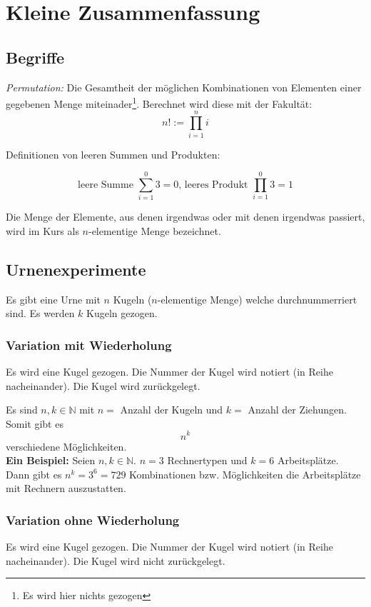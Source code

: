 \documentclass[12pt, twoside]{article}
\newcommand{\N}{\mathbb{N}}
\begin{document}
\section{Kleine Zusammenfassung}
\subsection{Begriffe}
\textit{Permutation:} Die Gesamtheit der möglichen Kombinationen von Elementen einer gegebenen
Menge miteinader\footnote{Es wird hier nichts gezogen}. Berechnet wird diese mit der Fakultät:
$$n!:= \prod_{i=1}^{n}i$$



Definitionen von leeren Summen und Produkten:

$$
\text{leere Summe } \sum_{i=1}^{0}3=0 \text{, leeres Produkt } \prod_{i=1}^{0}3=1
$$

Die Menge der Elemente, aus denen irgendwas oder mit denen irgendwas passiert,
wird im Kurs als $n$-elementige Menge bezeichnet. 

\subsection{Urnenexperimente}
Es gibt eine Urne mit $n$ Kugeln ($n$-elementige Menge) welche durchnummerriert sind. Es werden $k$ Kugeln gezogen.
\subsubsection{Variation mit Wiederholung}

Es wird eine Kugel gezogen. Die Nummer der Kugel wird notiert (in Reihe nacheinander). Die Kugel
wird zurückgelegt. 

Es sind $n, k \in \N$ mit $n=$ Anzahl der Kugeln und $k=$ Anzahl der Ziehungen. Somit gibt es
$$
n^k
$$
verschiedene Möglichkeiten. \\

\textbf{Ein Beispiel:} Seien $n, k \in \N$. $n=3$ Rechnertypen und $k=6$ Arbeitsplätze. Dann gibt es $n^k=3^6=729$ Kombinationen bzw. Möglichkeiten
die Arbeitsplätze mit Rechnern auszustatten. \\

\subsubsection{Variation ohne Wiederholung}

Es wird eine Kugel gezogen. Die Nummer der Kugel wird notiert (in Reihe nacheinander). Die Kugel wird nicht
zurückgelegt.
\end{document}
